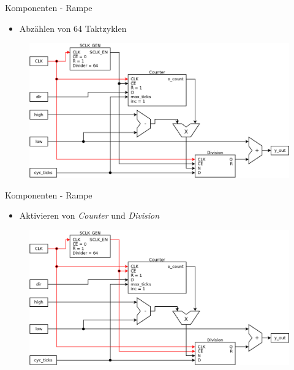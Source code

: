 \documentclass[11pt]{beamer}
\begin{document}
\begin{frame}{Komponenten - Rampe}
  \begin{itemize}
  \item  Abzählen von 64 Taktzyklen
  \end{itemize}
  \begin{figure}
    \includegraphics[scale=0.28]{ramp_step0}
  \end{figure}
\end{frame}

\begin{frame}{Komponenten - Rampe}
  \begin{itemize}
    \item Aktivieren von \emph{Counter} und \emph{Division}
  \end{itemize}
  \begin{figure}
    \includegraphics[scale=0.28]{ramp_step1}
  \end{figure}
\end{frame}
\end{document}
